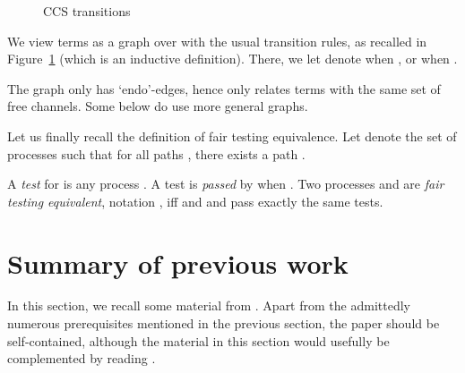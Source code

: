 \documentclass{LMCS}
\theoremstyle{plain}\newtheorem{satz}[thm]{Satz}
\begin{document}
\begin{figure}[t]
  \caption{CCS transitions}
  \label{fig:ccs}
\end{figure}
We view terms as a graph  over  with the usual transition
rules, as recalled in Figure~\ref{fig:ccs} (which is an inductive
definition).  There, we let  denote  when
, or  when .
\begin{rem}
  The graph  only has `endo'-edges, hence only relates terms with
  the same set of free channels. Some \ltss{} below do use more
  general graphs.
\end{rem}

Let us finally recall the definition of fair testing equivalence.
Let  denote the set of processes  such that 
for all paths , there exists a path 
.
\begin{defi}\label{def:ccsfair}
  A \emph{test} for  is any process .  A
  test  is \emph{passed} by  when .  Two processes  and  are
  \emph{fair testing equivalent}, notation , iff  and  and  pass exactly
  the same tests.
\end{defi}



\section{Summary of previous work}\label{sec:HP}
In this section, we recall some material from . Apart from the
admittedly numerous prerequisites mentioned in the previous section,
the paper should be self-contained, although the material in this
section would usefully be complemented by reading . 
\end{document}
